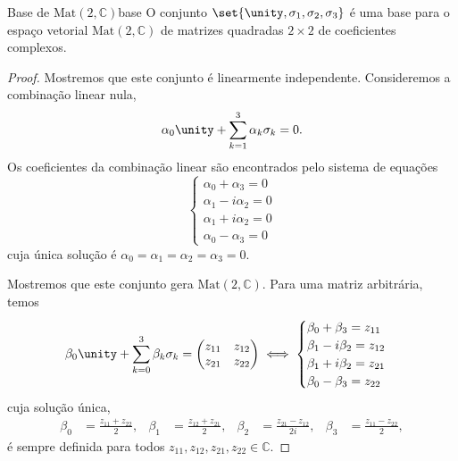 \begin{proposition}{Base de \(\mathrm{Mat}(2,\mathbb{C})\)}{base}
    O conjunto \(\set{\unity, \sigma_1, \sigma_2, \sigma_3}\) é uma base para o espaço vetorial \(\mathrm{Mat}(2,\mathbb{C})\) de matrizes quadradas \(2\times 2\) de coeficientes complexos.
\end{proposition}
\begin{proof}
    Mostremos que este conjunto é linearmente independente. Consideremos a combinação linear nula,
    \begin{equation*}
        \alpha_0 \unity + \sum_{k=1}^3\alpha_k \sigma_k = 0.
    \end{equation*}
    Os coeficientes da combinação linear são encontrados pelo sistema de equações
    \begin{equation*}
        \begin{cases}
            \alpha_0 + \alpha_3 = 0\\
            \alpha_1 - i \alpha_2 = 0\\
            \alpha_1 + i \alpha_2 = 0\\
            \alpha_0 - \alpha_3 = 0
        \end{cases}
    \end{equation*}
    cuja única solução é \(\alpha_0 = \alpha_1 = \alpha_2 = \alpha_3 = 0\).

    Mostremos que este conjunto gera \(\mathrm{Mat}(2,\mathbb{C})\). Para uma matriz arbitrária, temos
    \begin{equation*}
        \beta_0 \unity + \sum_{k = 0}^3 \beta_k \sigma_k = \begin{pmatrix}
            z_{11}&z_{12}\\z_{21}&z_{22}
        \end{pmatrix}
        \iff
        \begin{cases}
            \beta_0 + \beta_3 = z_{11}\\
            \beta_1 - i \beta_2 = z_{12}\\
            \beta_1 + i \beta_2 = z_{21}\\
            \beta_0 - \beta_3 = z_{22}
        \end{cases}
    \end{equation*}
    cuja solução única,
    \begin{align*}
        \beta_0 &= \frac{z_{11} + z_{22}}{2},&
        \beta_1 &= \frac{z_{12} + z_{21}}{2},&
        \beta_2 &= \frac{z_{21} - z_{12}}{2i},&
        \beta_3 &= \frac{z_{11} - z_{22}}{2},
    \end{align*}
    é sempre definida para todos \(z_{11}, z_{12}, z_{21}, z_{22} \in \mathbb{C}\).
\end{proof}

